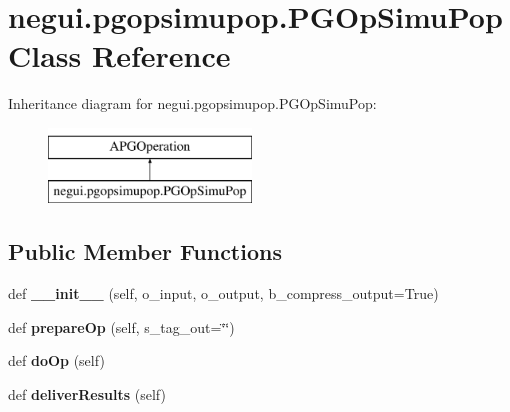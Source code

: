 \hypertarget{classnegui_1_1pgopsimupop_1_1PGOpSimuPop}{}\section{negui.\+pgopsimupop.\+P\+G\+Op\+Simu\+Pop Class Reference}
\label{classnegui_1_1pgopsimupop_1_1PGOpSimuPop}
Inheritance diagram for negui.\+pgopsimupop.\+P\+G\+Op\+Simu\+Pop\+:\begin{figure}[H]
\begin{center}
\leavevmode
\includegraphics[height=2.000000cm]{classnegui_1_1pgopsimupop_1_1PGOpSimuPop}
\end{center}
\end{figure}
\subsection*{Public Member Functions}
\begin{DoxyCompactItemize}
\item 
def {\bfseries \+\_\+\+\_\+init\+\_\+\+\_\+} (self, o\+\_\+input, o\+\_\+output, b\+\_\+compress\+\_\+output=True)\hypertarget{classnegui_1_1pgopsimupop_1_1PGOpSimuPop_a33d838529132c2dd2c0bd943f3fbf8e1}{}\label{classnegui_1_1pgopsimupop_1_1PGOpSimuPop_a33d838529132c2dd2c0bd943f3fbf8e1}

\item 
def {\bfseries prepare\+Op} (self, s\+\_\+tag\+\_\+out=\char`\"{}\char`\"{})\hypertarget{classnegui_1_1pgopsimupop_1_1PGOpSimuPop_a2f255ee2acb3d3f0341cc2f7cf1e3ad3}{}\label{classnegui_1_1pgopsimupop_1_1PGOpSimuPop_a2f255ee2acb3d3f0341cc2f7cf1e3ad3}

\item 
def {\bfseries do\+Op} (self)\hypertarget{classnegui_1_1pgopsimupop_1_1PGOpSimuPop_aed657d7d631aa0e8c2f40f8411c95dcd}{}\label{classnegui_1_1pgopsimupop_1_1PGOpSimuPop_aed657d7d631aa0e8c2f40f8411c95dcd}

\item 
def {\bfseries deliver\+Results} (self)\hypertarget{classnegui_1_1pgopsimupop_1_1PGOpSimuPop_a35c9e5794e68274f42147644b2e968c5}{}\label{classnegui_1_1pgopsimupop_1_1PGOpSimuPop_a35c9e5794e68274f42147644b2e968c5}

\end{DoxyCompactItemize}
